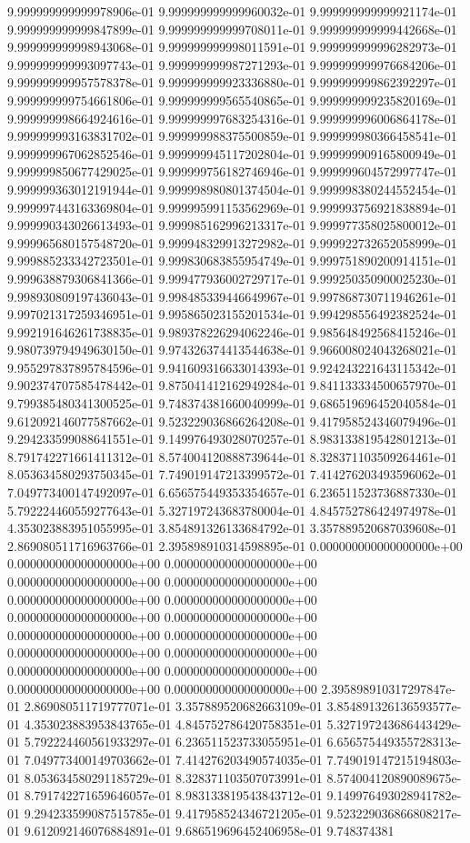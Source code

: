9.999999999999978906e-01	9.999999999999960032e-01	9.999999999999921174e-01	9.999999999999847899e-01	9.999999999999708011e-01	9.999999999999442668e-01	9.999999999998943068e-01	9.999999999998011591e-01	9.999999999996282973e-01	9.999999999993097743e-01	9.999999999987271293e-01	9.999999999976684206e-01	9.999999999957578378e-01	9.999999999923336880e-01	9.999999999862392297e-01	9.999999999754661806e-01	9.999999999565540865e-01	9.999999999235820169e-01	9.999999998664924616e-01	9.999999997683254316e-01	9.999999996006864178e-01	9.999999993163831702e-01	9.999999988375500859e-01	9.999999980366458541e-01	9.999999967062852546e-01	9.999999945117202804e-01	9.999999909165800949e-01	9.999999850677429025e-01	9.999999756182746946e-01	9.999999604572997747e-01	9.999999363012191944e-01	9.999998980801374504e-01	9.999998380244552454e-01	9.999997443163369804e-01	9.999995991153562969e-01	9.999993756921838894e-01	9.999990343026613493e-01	9.999985162996213317e-01	9.999977358025800012e-01	9.999965680157548720e-01	9.999948329913272982e-01	9.999922732652058999e-01	9.999885233342723501e-01	9.999830683855954749e-01	9.999751890200914151e-01	9.999638879306841366e-01	9.999477936002729717e-01	9.999250350900025230e-01	9.998930809197436043e-01	9.998485339446649967e-01	9.997868730711946261e-01	9.997021317259346951e-01	9.995865023155201534e-01	9.994298556492382524e-01	9.992191646261738835e-01	9.989378226294062246e-01	9.985648492568415246e-01	9.980739794949630150e-01	9.974326374413544638e-01	9.966008024043268021e-01	9.955297837895784596e-01	9.941609316633014393e-01	9.924243221643115342e-01	9.902374707585478442e-01	9.875041412162949284e-01	9.841133334500657970e-01	9.799385480341300525e-01	9.748374381660040999e-01	9.686519696452040584e-01	9.612092146077587662e-01	9.523229036866264208e-01	9.417958524346079496e-01	9.294233599088641551e-01	9.149976493028070257e-01	8.983133819542801213e-01	8.791742271661411312e-01	8.574004120888739644e-01	8.328371103509264461e-01	8.053634580293750345e-01	7.749019147213399572e-01	7.414276203493596062e-01	7.049773400147492097e-01	6.656575449353354657e-01	6.236511523736887330e-01	5.792224460559277643e-01	5.327197243683780004e-01	4.845752786424974978e-01	4.353023883951055995e-01	3.854891326133684792e-01	3.357889520687039608e-01	2.869080511716963766e-01	2.395898910314598895e-01	0.000000000000000000e+00	0.000000000000000000e+00	0.000000000000000000e+00	0.000000000000000000e+00	0.000000000000000000e+00	0.000000000000000000e+00	0.000000000000000000e+00	0.000000000000000000e+00	0.000000000000000000e+00	0.000000000000000000e+00	0.000000000000000000e+00	0.000000000000000000e+00	0.000000000000000000e+00	0.000000000000000000e+00	0.000000000000000000e+00	0.000000000000000000e+00	0.000000000000000000e+00	2.395898910317297847e-01	2.869080511719777071e-01	3.357889520682663109e-01	3.854891326136593577e-01	4.353023883953843765e-01	4.845752786420758351e-01	5.327197243686443429e-01	5.792224460561933297e-01	6.236511523733055951e-01	6.656575449355728313e-01	7.049773400149703662e-01	7.414276203490574035e-01	7.749019147215194803e-01	8.053634580291185729e-01	8.328371103507073991e-01	8.574004120890089675e-01	8.791742271659646057e-01	8.983133819543843712e-01	9.149976493028941782e-01	9.294233599087515785e-01	9.417958524346721205e-01	9.523229036866808217e-01	9.612092146076884891e-01	9.686519696452406958e-01	9.748374381